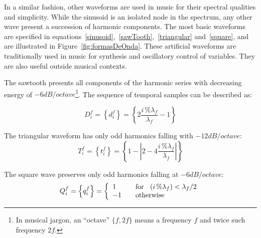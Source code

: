 In a similar fashion, other waveforms are used in music for their spectral qualities and simplicity. While the sinusoid is an isolated node in the spectrum, any other wave present a succession of harmonic components. The most basic waveforms are specified in equations~\ref{sinusoid},~\ref{sawTooth},~\ref{triangular} and~\ref{square}, and are illustrated in Figure~\ref{fig:formasDeOnda}.
These artificial waveforms are traditionally used in music for synthesis and oscillatory control of variables. They are also useful outside musical contexts\cite{Openheim}.

The sawtooth presents all components of the harmonic series with decreasing energy of $-6dB/octave$\footnote{In 
musical jargon, an ``octave'' $\{f,2f\}$ means a frequency $f$ and twice such frequency $2f$.}. The sequence of temporal samples can be described as:

\begin{equation}\label{sawTooth}
     D^f_i=\left\{ d^f_i \right\}=\left\{ 2\frac{i\,\%\lambda_f}{\lambda_f} -1 \right\}
\end{equation}

The triangular waveform has only odd harmonics falling with $-12dB/octave$:
\begin{equation}\label{triangular}
     T^f_i=\left\{ t^f_i \right\}=\left\{1- \left| 2 - 4\frac{i\,\%\lambda_f}{\lambda_f} \right| \right\}
\end{equation}

The square wave preserves only odd harmonics falling at $-6dB/octave$:
\begin{equation}\label{square}
     Q^f_i=\left\{ q^f_i \right\}= \left\{
         \begin{array}{l l}
              1 & \quad \text{for } \; \; (i\,\%\lambda_f)   <  \lambda_f /2  \\
              -1 & \quad \text{otherwise}\\
         \end{array} \right.
\end{equation}

